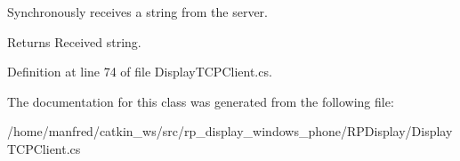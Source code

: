 \-Synchronously receives a string from the server. 

\begin{DoxyReturn}{\-Returns}
\-Received string.
\end{DoxyReturn}


\-Definition at line 74 of file \-Display\-T\-C\-P\-Client.\-cs.



\-The documentation for this class was generated from the following file\-:\begin{DoxyCompactItemize}
\item 
/home/manfred/catkin\-\_\-ws/src/rp\-\_\-display\-\_\-windows\-\_\-phone/\-R\-P\-Display/\-Display\-T\-C\-P\-Client.\-cs\end{DoxyCompactItemize}
